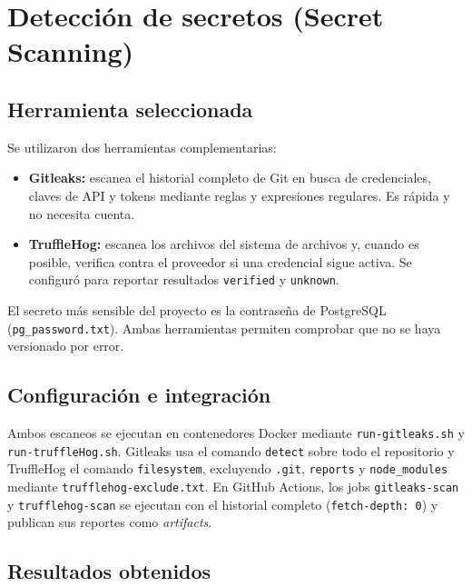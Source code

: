 
\section{Detección de secretos (Secret Scanning)}

\subsection{Herramienta seleccionada}

Se utilizaron dos herramientas complementarias:

\begin{itemize}
    \item \textbf{Gitleaks:} escanea el historial completo de Git en busca
    de credenciales, claves de API y tokens mediante reglas y expresiones
    regulares. Es rápida y no necesita cuenta.
    \item \textbf{TruffleHog:} escanea los archivos del sistema de archivos
    y, cuando es posible, verifica contra el proveedor si una credencial
    sigue activa. Se configuró para reportar resultados
    \texttt{verified} y \texttt{unknown}.
\end{itemize}

El secreto más sensible del proyecto es la contraseña de PostgreSQL
(\texttt{pg\_password.txt}). Ambas herramientas permiten comprobar que no
se haya versionado por error.

\subsection{Configuración e integración}

{\sloppy
Ambos escaneos se ejecutan en contenedores Docker mediante
\texttt{run-gitleaks.sh} y \texttt{run-truffleHog.sh}. Gitleaks usa el
comando \texttt{detect} sobre todo el repositorio y TruffleHog el comando
\texttt{filesystem}, excluyendo \texttt{.git}, \texttt{reports} y
\texttt{node\_modules} mediante \texttt{trufflehog-exclude.txt}. En GitHub
Actions, los jobs \texttt{gitleaks-scan} y \texttt{trufflehog-scan} se
ejecutan con el historial completo (\texttt{fetch-depth: 0}) y publican sus
reportes como \textit{artifacts}.
\par}

\subsection{Resultados obtenidos}

